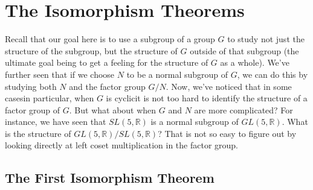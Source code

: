 \documentclass[10pt,]{book}
\theoremstyle{plain}
\theoremstyle{definition}
\theoremstyle{definition}
\theoremstyle{definition}
\theoremstyle{definition}
\numberwithin{equation}{section}
\def\R{\mathbb{R}}
\begin{document}
\typeout{************************************************}
\typeout{************************************************}
\chapter[{The Isomorphism Theorems}]{The Isomorphism Theorems}\label{isothms}
\typeout{************************************************}
\typeout{************************************************}

      Recall that our goal here is to use a subgroup of a group \(G\) to
      study not just the structure of the subgroup, but the structure of
      \(G\) outside of that subgroup (the ultimate goal being to get a
      feeling for the structure of \(G\) as a whole). We've further seen
      that if we choose \(N\) to be a normal subgroup of \(G\), we can do this
      by studying both \(N\) and the factor group \(G/N\). Now, we've noticed
      that in some cases\textemdash{}in particular, when \(G\) is cyclic\textendash{}it is not
      too hard to identify the structure of a factor group of \(G\). But
      what about when \(G\) and \(N\) are more complicated? For instance, we
      have seen that \(SL(5,\R)\) is a normal subgroup of \(GL(5,\R)\).
      What is the structure of \(GL(5,\R)/SL(5,\R)\)? That is not so
      easy to figure out by looking directly at left coset multiplication
      in the factor group.
\typeout{************************************************}
\typeout{************************************************}
\section[{The First Isomorphism Theorem}]{The First Isomorphism Theorem}\label{section-28}
\end{document}
